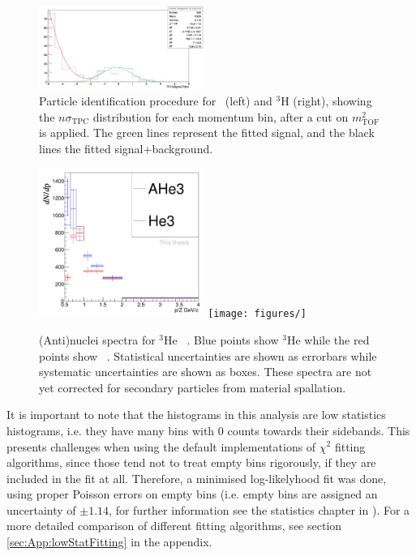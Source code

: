 \begin{figure}
    \includegraphics[width=0.48\textwidth]{figures/triton/Triton_TPCnSigma_Bin4.png}
    \caption{Particle identification procedure for \atrit\ (left) and $^3\mathrm{H}$ (right), showing the $n\sigma_{\mathrm{TPC}}$ distribution for each momentum bin, after a cut on $m_{\mathrm{TOF}}^2$ is applied. The green lines represent the fitted signal, and the black lines the fitted signal+background.}
    \label{fig:h3_TPC_PID}
\end{figure}

\begin{figure}
    \centering
    \includegraphics[width=0.48\textwidth]{figures/he3_spectra.png}
    \texttt{[image: figures/]}
    \caption{(Anti)nuclei spectra for $^3\mathrm{He}$ \ahe\ . Blue points show $^3\mathrm{He}$ while the red points show \ahe\ . Statistical uncertainties are shown as errorbars while systematic uncertainties are shown as boxes. These spectra are not yet corrected for secondary particles from material spallation.}
    \label{fig:(anti)nucleiSpectra}
\end{figure}


\begin{table}
\end{table}

It is important to note that the histograms in this analysis are low statistics histograms, i.e. they have many bins with 0 counts towards their sidebands. This presents challenges when using the default implementations of $\chi^2$ fitting algorithms, since those tend not to treat empty bins rigorously, if they are included in the fit at all. Therefore, a minimised log-likelyhood fit was done, using proper Poisson errors on empty bins (i.e. empty bins are assigned an uncertainty of $\pm 1.14$, for further information see the statistics chapter in \cite{PDG2022}). For a more detailed comparison of different fitting algorithms, see section \ref{sec:App:lowStatFitting} in the appendix.

